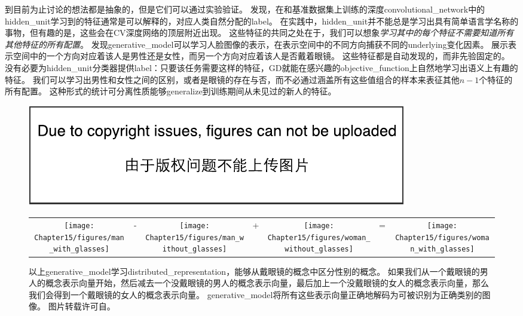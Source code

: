 
到目前为止讨论的想法都是抽象的，但是它们可以通过实验验证。
\cite{Zhou-et-al-ICLR2015}发现，在和基准数据集上训练的深度\gls{convolutional_network}中的\gls{hidden_unit}学习到的特征通常是可以解释的，对应人类自然分配的\gls{label}。
在实践中，\gls{hidden_unit}并不能总是学习出具有简单语言学名称的事物，但有趣的是，这些会在\gls{CV}深度网络的顶层附近出现。
这些特征的共同之处在于，我们可以想象\emph{学习其中的每个特征不需要知道所有其他特征的所有配置}。
\cite{radford2015unsupervised}发现\gls{generative_model}可以学习人脸图像的表示，在表示空间中的不同方向捕获不同的\gls{underlying}变化因素。
展示表示空间中的一个方向对应着该人是男性还是女性，而另一个方向对应着该人是否戴着眼镜。
这些特征都是自动发现的，而非先验固定的。
没有必要为\gls{hidden_unit}分类器提供\gls{label}：只要该任务需要这样的特征，\gls{GD}就能在感兴趣的\gls{objective_function}上自然地学习出语义上有趣的特征。
我们可以学习出男性和女性之间的区别，或者是眼镜的存在与否，而不必通过涵盖所有这些值组合的样本来表征其他$n-1$个特征的所有配置。
这种形式的统计可分离性质能够\gls{generalize}到训练期间从未见过的新人的特征。



\begin{figure}[!htb]
\ifOpenSource
\centerline{\includegraphics{figure.pdf}}
\else
\begin{tabular}{ccccccc}
\texttt{[image: Chapter15/figures/man\_with\_glasses]} &
- &
\texttt{[image: Chapter15/figures/man\_without\_glasses]} &
+ &
\texttt{[image: Chapter15/figures/woman\_without\_glasses]} &
= &
\texttt{[image: Chapter15/figures/woman\_with\_glasses]}
\end{tabular}
\fi
\caption{以上\gls{generative_model}学习\gls{distributed_representation}，能够从戴眼镜的概念中区分性别的概念。
如果我们从一个戴眼镜的男人的概念表示向量开始，然后减去一个没戴眼镜的男人的概念表示向量，最后加上一个没戴眼镜的女人的概念表示向量，那么我们会得到一个戴眼镜的女人的概念表示向量。
\gls{generative_model}将所有这些表示向量正确地解码为可被识别为正确类别的图像。
图片转载许可自\cite{radford2015unsupervised}。
}
\label{fig:chap15_generative_glasses}
\end{figure}

